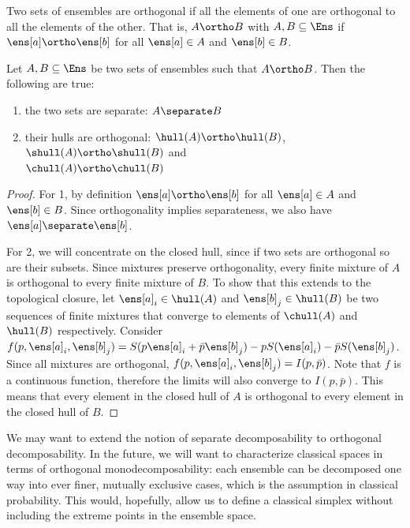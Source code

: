 \begin{mathSection}
\begin{defn}
	Two sets of ensembles are orthogonal if all the elements of one are orthogonal to all the elements of the other. That is, $A \ortho B$ with $A, B \subseteq \Ens$ if $\ens[a] \ortho \ens[b]$ for all $\ens[a] \in A$ and $\ens[b] \in B$. 
\end{defn}

\begin{prop}
	Let $A, B \subseteq \Ens$ be two sets of ensembles such that $A \ortho B$. Then the following are true:
	\begin{enumerate}
		\item the two sets are separate: $A \separate B$
		\item their hulls are orthogonal: $\hull(A) \ortho \hull(B)$, $\shull(A) \ortho \shull(B)$ and  \\ $\chull(A) \ortho \chull(B)$
	\end{enumerate}
\end{prop}

\begin{proof}
	For 1, by definition $\ens[a] \ortho \ens[b]$ for all $\ens[a] \in A$ and $\ens[b] \in B$. Since orthogonality implies separateness, we also have $\ens[a] \separate \ens[b]$.
	
	For 2, we will concentrate on the closed hull, since if two sets are orthogonal so are their subsets. Since mixtures preserve orthogonality, every finite mixture of $A$ is orthogonal to every finite mixture of $B$. To show that this extends to the topological closure, let $\ens[a]_i \in \hull(A)$ and $\ens[b]_j \in \hull(B)$ be two sequences of finite mixtures that converge to elements of $\chull(A)$ and $\hull(B)$ respectively. Consider $f(p,\ens[a]_i, \ens[b]_j) = S(p \ens[a]_i + \bar{p} \ens[b]_j) - p S(\ens[a]_i) - \bar{p} S(\ens[b]_j)$. Since all mixtures are orthogonal, $f(p,\ens[a]_i, \ens[b]_j) = I(p,\bar{p})$. Note that $f$ is a continuous function, therefore the limits will also converge to $I(p,\bar{p})$. This means that every element in the closed hull of $A$ is orthogonal to every element in the closed hull of $B$.
\end{proof}
\end{mathSection}

We may want to extend the notion of separate decomposability to orthogonal decomposability. In the future, we will want to characterize classical spaces in terms of orthogonal monodecomposability: each ensemble can be decomposed one way into ever finer, mutually exclusive cases, which is the assumption in classical probability. This would, hopefully, allow us to define a classical simplex without including the extreme points in the ensemble space.

